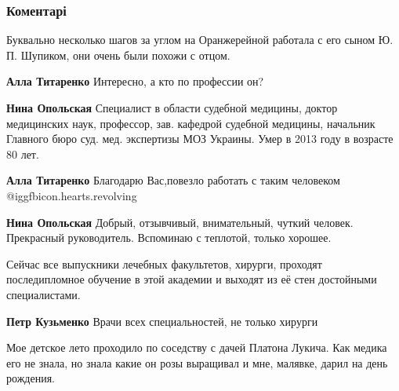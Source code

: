  
 
 
 
 
\subsubsection{Коментарі}

\begin{itemize} %
Буквально несколько шагов за углом на Оранжерейной работала с его сыном Ю. П. Шупиком, они очень были похожи с отцом.

\begin{itemize} %
\textbf{Алла Титаренко} Интересно, а кто по профессии он?

\textbf{Нина Опольская} Специалист в области судебной медицины, доктор медицинских наук, профессор, зав. кафедрой судебной медицины, начальник Главного бюро суд. мед. экспертизы МОЗ Украины. Умер в 2013 году в возрасте 80 лет.

\textbf{Алла Титаренко} Благодарю Вас,повезло работать с таким человеком  @igg{fbicon.hearts.revolving} 

\textbf{Нина Опольская} Добрый, отзывчивый, внимательный, чуткий человек. Прекрасный руководитель. Вспоминаю с теплотой, только хорошее.
\end{itemize} %


Сейчас все выпускники лечебных факультетов, хирурги, проходят последипломное
обучение в этой академии и выходят из её стен достойными специалистами.

\textbf{Петр Кузьменко} Врачи всех специальностей, не только хирурги


Мое детское лето проходило по соседству с дачей Платона Лукича. Как медика его
не знала, но знала какие он розы выращивал и мне, малявке, дарил на день
рождения.

\end{itemize} %
